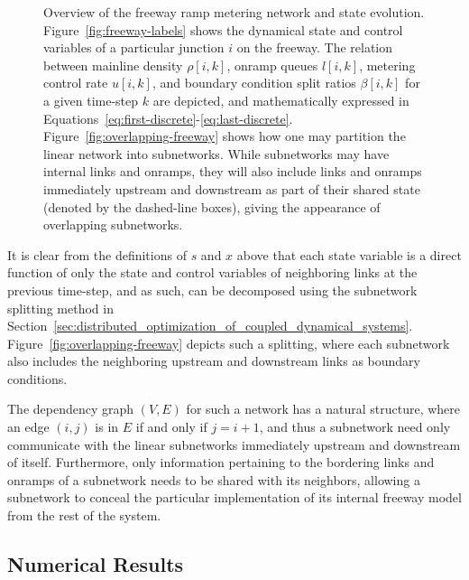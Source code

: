\begin{figure}
 \hfill
{}
\caption{Overview of the freeway ramp metering network and state evolution. Figure~\ref{fig:freeway-labels} shows the dynamical state and control variables of a particular junction $i$ on the freeway. The relation between mainline density $\rho{[i,k]}$, onramp queues $l{[i,k]}$, metering control rate $u{[i,k]}$, and boundary condition split ratios $\beta{[i,k]}$ for a given time-step $k$ are depicted, and mathematically expressed in Equations~\eqref{eq:first-discrete}-\eqref{eq:last-discrete}.  Figure~\ref{fig:overlapping-freeway} shows how one may partition the linear network into subnetworks.   While subnetworks may have internal links and onramps, they will also include links and onramps immediately upstream and downstream as part of their shared state (denoted by the dashed-line boxes), giving the appearance of overlapping subnetworks.}
\label{fig:freeway}
\end{figure}

It is clear from the definitions of $s$ and $x$ above that each state variable is a direct function of only the state and control variables of neighboring links at the previous time-step, and as such, can be decomposed using the subnetwork splitting method in Section~\ref{sec:distributed_optimization_of_coupled_dynamical_systems}. Figure~\ref{fig:overlapping-freeway} depicts such a splitting, where each subnetwork also includes the neighboring upstream and downstream links as boundary conditions.

The dependency graph $\left(V,E\right)$ for such a network has a natural structure, where an edge $(i,j)$ is in $E$ if and only if $j=i+1$, and thus a subnetwork need only communicate with the linear subnetworks immediately upstream and downstream of itself. Furthermore, only information pertaining to the bordering links and onramps of a subnetwork needs to be shared with its neighbors, allowing a subnetwork to conceal the particular implementation of its internal freeway model from the rest of the system.

\subsection{Numerical Results}
\label{sec:numerical_results-admm}